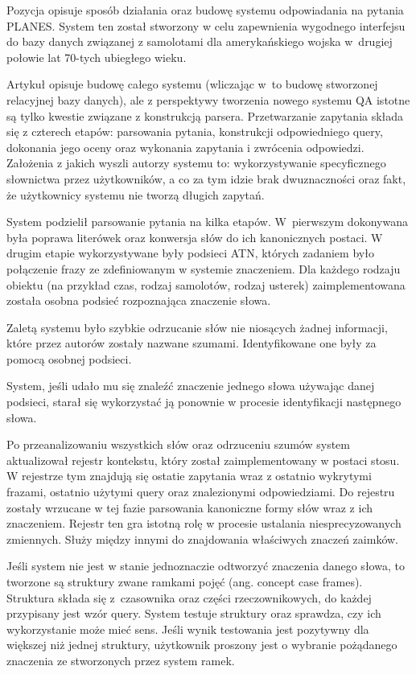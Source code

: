 Pozycja \cite{waltz1978english} opisuje sposób działania oraz budowę systemu odpowiadania na pytania PLANES. System ten został stworzony w celu zapewnienia wygodnego interfejsu do bazy danych związanej z samolotami dla amerykańskiego wojska w~drugiej połowie lat 70-tych ubiegłego wieku.

Artykuł \cite{waltz1978english} opisuje budowę całego systemu (wliczając w~to budowę stworzonej relacyjnej bazy danych), ale z perspektywy tworzenia nowego systemu QA istotne są tylko kwestie związane z konstrukcją parsera. Przetwarzanie zapytania składa się z czterech etapów: parsowania pytania, konstrukcji odpowiedniego query, dokonania jego oceny oraz wykonania zapytania i zwrócenia odpowiedzi. Założenia z jakich wyszli autorzy systemu to: wykorzystywanie specyficznego słownictwa przez użytkowników, a co za tym idzie brak dwuznaczności oraz fakt, że użytkownicy systemu nie tworzą długich zapytań.

System podzielił parsowanie pytania na kilka etapów. W~pierwszym dokonywana była poprawa literówek oraz konwersja słów do ich kanonicznych postaci. W drugim etapie wykorzystywane były podsieci ATN, których zadaniem było połączenie frazy ze zdefiniowanym w systemie znaczeniem. Dla każdego rodzaju obiektu (na przykład czas, rodzaj samolotów, rodzaj usterek) zaimplementowana została osobna podsieć rozpoznająca znaczenie słowa. 

Zaletą systemu było szybkie odrzucanie słów nie niosących żadnej informacji, które przez autorów \cite{waltz1978english} zostały nazwane szumami. Identyfikowane one były za pomocą osobnej podsieci. 

System, jeśli udało mu się znaleźć znaczenie jednego słowa używając danej podsieci, starał się wykorzystać ją ponownie w procesie identyfikacji następnego słowa.

Po przeanalizowaniu wszystkich słów oraz odrzuceniu szumów system aktualizował rejestr kontekstu, który został zaimplementowany w postaci stosu. W rejestrze tym znajdują się ostatie zapytania wraz z ostatnio wykrytymi frazami, ostatnio użytymi query oraz znalezionymi odpowiedziami. Do rejestru zostały wrzucane w tej fazie parsowania kanoniczne formy słów wraz z ich znaczeniem. Rejestr ten gra istotną rolę w procesie ustalania niesprecyzowanych zmiennych. Służy między innymi do znajdowania właściwych znaczeń zaimków.

Jeśli system nie jest w stanie jednoznaczie odtworzyć znaczenia danego słowa, to tworzone są struktury zwane ramkami pojęć (ang. concept case frames). Struktura składa się z~czasownika oraz części rzeczownikowych, do każdej przypisany jest wzór query. System testuje struktury oraz sprawdza, czy ich wykorzystanie może mieć sens. Jeśli wynik testowania jest pozytywny dla większej niż jednej struktury, użytkownik proszony jest o wybranie pożądanego znaczenia ze stworzonych przez system ramek.

